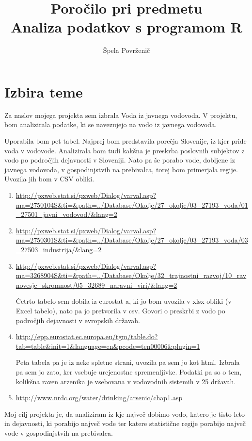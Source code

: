 \documentclass[11pt,a4paper]{article}
\begin{document}
\title{Poročilo pri predmetu \\
Analiza podatkov s programom R}
\author{Špela Povrženič}
\maketitle

\section{Izbira teme}
Za naslov mojega projekta sem izbrala Voda iz javnega vodovoda.
V projektu, bom analizirala podatke, ki se navezujejo na vodo iz javnega vodovoda. 

Uporabila bom pet tabel. 
Najprej bom predstavila porečja Slovenije, iz kjer pride voda v vodovode. Analizirala bom tudi kakšna je preskrba poslovnih subjektov z vodo po področjih dejavnosti v Sloveniji. Nato pa še porabo vode, dobljene iz javnega vodovoda, v gospodinjstvih na prebivalca, torej bom primerjala regije. Uvozila jih bom v CSV obliki.

\begin{enumerate} 
\item{\url{http://pxweb.stat.si/pxweb/Dialog/varval.asp?ma=2750104S&ti=&path=../Database/Okolje/27_okolje/03_27193_voda/01_27501_javni_vodovod/&lang=2}}

\item{\url{http://pxweb.stat.si/pxweb/Dialog/varval.asp?ma=2750301S&ti=&path=../Database/Okolje/27_okolje/03_27193_voda/03_27503_industrija/&lang=2}}

\item{\url{http://pxweb.stat.si/pxweb/Dialog/varval.asp?ma=3268904S&ti=&path=../Database/Okolje/32_trajnostni_razvoj/10_ravnovesje_skromnost/05_32689_naravni_viri/&lang=2}}

Četrto tabelo sem dobila iz eurostat-a, ki jo bom uvozila v xlsx obliki (v Excel tabelo), nato pa jo pretvorila v csv. Govori o preskrbi z vodo po področjih dejavnosti v evropskih državah.

\item{\url{http://epp.eurostat.ec.europa.eu/tgm/table.do?tab=table&init=1&language=en&pcode=ten00006&plugin=1}}

Peta tabela pa je iz neke spletne strani, uvozila pa sem jo kot html. Izbrala pa sem jo zato, ker vsebuje urejenostne spremenljivke. Podatki pa so o tem, kolikšna raven arzenika je vsebovana v vodovodnih sistemih v 25 državah.

\item{\url{http://www.nrdc.org/water/drinking/arsenic/chap1.asp}}
\end{enumerate}
Moj cilj projekta je, da analiziram iz kje največ dobimo vodo, katero je tisto leto in  dejavnosti, ki porabijo največ vode ter katere statistične regije porabijo največ vode v gospodinjstvih na prebivalca. 
\end{document}

